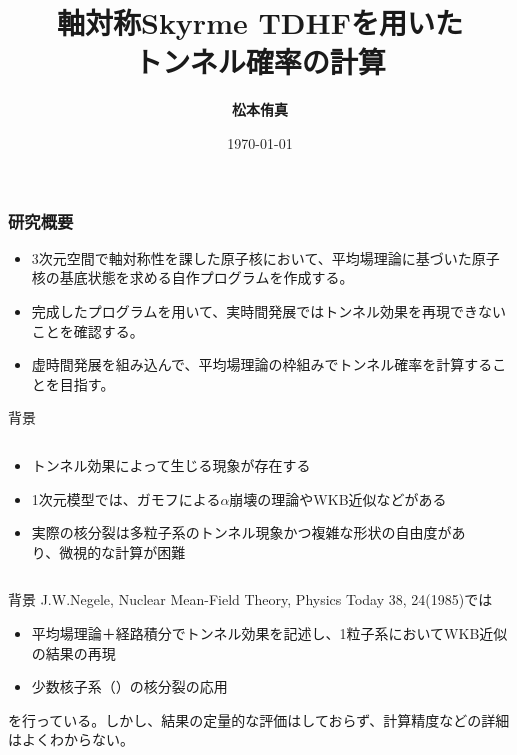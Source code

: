 \documentclass[12pt,aspectratio=169,xcolor=dvipsnames,table,dvipdfmx]{beamer}
\title{軸対称Skyrme TDHFを用いた\\トンネル確率の計算}
\author{\textbf{松本侑真}}
\date{\today}
\institute{原子核理論 関澤研究室}
\theoremstyle{definition}
\begin{document}
\maketitle

\begin{frame}
  \frametitle{研究概要}
  \begin{itemize}
    \item 3次元空間で軸対称性を課した原子核において、平均場理論に基づいた原子核の基底状態を求める自作プログラムを作成する。
    \item 完成したプログラムを用いて、実時間発展ではトンネル効果を再現できないことを確認する。
    \item 虚時間発展を組み込んで、平均場理論の枠組みでトンネル確率を計算することを目指す。
  \end{itemize}
\end{frame}


\begin{frame}{背景}
  \begin{columns}[t]
    \begin{column}{.5\textwidth}
      \begin{itemize}
        \item トンネル効果によって生じる現象が存在する
        \item 1次元模型では、ガモフによる$\alpha$崩壊の理論やWKB近似などがある
        \item 実際の核分裂は多粒子系のトンネル現象かつ複雑な形状の自由度があり、微視的な計算が困難
      \end{itemize}
  
    \end{column}
    \begin{column}{.5\textwidth}
    \end{column}
  \end{columns}
\end{frame}


\begin{frame}{背景}
  J.W.Negele, Nuclear Mean-Field Theory, Physics Today 38, 24(1985)では
  \begin{itemize}
    \item 平均場理論＋経路積分でトンネル効果を記述し、1粒子系においてWKB近似の結果の再現
    \item 少数核子系（）の核分裂の応用
  \end{itemize}
  を行っている。しかし、結果の定量的な評価はしておらず、計算精度などの詳細はよくわからない。
\end{frame}
\end{document}
